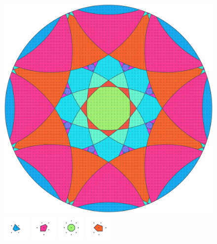 \documentclass[text.tex]{subfiles}
\begin{document}
\clearpage
\pagestyle{fancy}
\fancyhf{}
\begin{figure}[h!]
\centering
\includegraphics[width=1\textwidth]{img/results/circle8/circle8_126580_(1247_-516alpha_1).pdf}
\includegraphics[width=0.12\textwidth]{img/results/circle8/circle8_126580_(1247_-516alpha_1)_001.pdf}
\includegraphics[width=0.12\textwidth]{img/results/circle8/circle8_126580_(1247_-516alpha_1)_002.pdf}
\includegraphics[width=0.12\textwidth]{img/results/circle8/circle8_126580_(1247_-516alpha_1)_003.pdf}
\includegraphics[width=0.12\textwidth]{img/results/circle8/circle8_126580_(1247_-516alpha_1)_004.pdf}

\end{figure}
\end{document}
